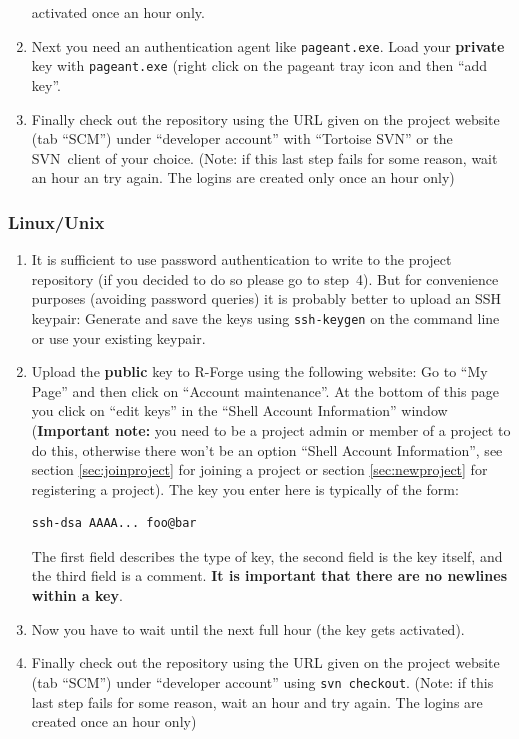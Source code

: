 \documentclass[a4paper]{article}
\newcommand{\proglang}[1]{\textsf{#1}}
\begin{document}
\begin{enumerate}
  activated once an hour only.
\item Next you need an authentication agent like \texttt{pageant.exe}. Load
  your \textbf{private} key with \texttt{pageant.exe} (right click on
  the pageant tray icon and then ``add key''.
\item Finally check out the repository using the URL given on the
  project website (tab ``SCM'') under ``developer account'' with
  ``Tortoise SVN'' or the SVN~client of your choice. (Note: if this last step
  fails for some reason, wait an hour an try again. The logins are
  created only once an hour only)
\end{enumerate}

\subsubsection{Linux/Unix}
\label{sec:scm-unix}

\begin{enumerate}
\item It is sufficient to use password authentication to write to the
  project repository (if you decided to do so please go to
  step~4). But for convenience purposes (avoiding password 
  queries) it is probably better to upload an SSH keypair: Generate
  and save the keys 
  using \texttt{ssh-keygen} on the command line or use your existing keypair.  
\item Upload the \textbf{public} key to \proglang{R}-Forge using the following
  website: Go to 
  ``My Page'' and then click on ``Account maintenance''. At the bottom
  of this page you click on ``edit keys'' in the ``Shell Account
  Information'' window (\textbf{Important note:} you need to be a project admin
  or member of a project to do this, otherwise there won't be an
  option ``Shell Account Information'', see section
  \ref{sec:joinproject} for joining a project or section
  \ref{sec:newproject} for registering a project).
  The key you enter here is typically of the form:
\begin{verbatim}
ssh-dsa AAAA... foo@bar
\end{verbatim}
  The first field
  describes the type of key, the second field is the key itself, and
  the third field is a comment. \textbf{It is important that there are
    no newlines within a key}.
\item Now you have to wait until the next full hour (the key gets activated).
\item Finally check out the repository using the URL given on the
  project website (tab ``SCM'') under ``developer account'' using
  \texttt{svn checkout}. (Note: if this last step
  fails for some reason, wait an hour and try again. The logins are
  created once an hour only)
\end{enumerate}
\end{document}
